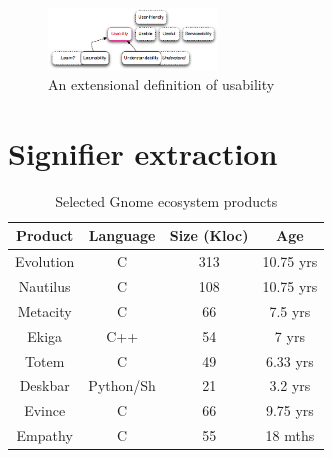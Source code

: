\documentclass[conference, compsoc]{IEEEtran}
\begin{document}
\begin{figure}[b]
\centering
\includegraphics[width=0.4\textwidth]{synonym-graph.png}
\caption{An extensional definition of usability}
\label{fig:syngraph}
\end{figure}
	
	
\section{Signifier extraction} %
\begin{table}
	\caption{Selected Gnome ecosystem products}
	\centering
	\label{tbl:projects}
\begin{tabular}{|c|c|c|c|}
\hline
Product & Language & Size (Kloc) & Age \\
\hline
\hline
Evolution & C & 313 & 10.75 yrs\\
Nautilus & C & 108 & 10.75 yrs\\
Metacity & C & 66 & 7.5 yrs\\
Ekiga & C++ & 54 & 7 yrs\\
Totem & C & 49 & 6.33 yrs\\
Deskbar & Python/Sh & 21 & 3.2 yrs\\
Evince & C & 66 & 9.75 yrs\\
Empathy &C & 55 & 18 mths\\
\hline
\end{tabular}
\end{table}
\end{document}
